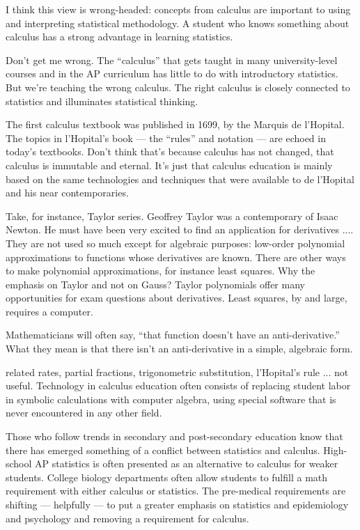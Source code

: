 I think this view is wrong-headed: concepts from calculus are important to using and interpreting statistical methodology.  A student who knows something about calculus has a strong advantage in learning statistics.

Don't get me wrong.  The ``calculus'' that gets taught in many university-level courses and in the AP curriculum has little to do with introductory statistics.  But we're teaching the wrong calculus.  The right calculus is closely connected to statistics and illuminates statistical thinking.

The first calculus textbook was published in 1699, by the Marquis de l'Hopital.  The topics in l'Hopital's book --- the ``rules'' and notation --- are echoed in today's textbooks.  Don't think that's because calculus has not changed, that calculus is immutable and eternal.  It's just that calculus education is mainly based on the same technologies and techniques that were available to de l'Hopital and his near contemporaries.

Take, for instance, Taylor series.  Geoffrey Taylor was a contemporary of Isaac Newton.   He must have been very excited to find an application for derivatives ....  They are not used so much except for algebraic purposes: low-order polynomial approximations to functions whose derivatives are known.  There are other ways to make polynomial approximations, for instance least squares.   Why the emphasis on Taylor and not on Gauss?  Taylor polynomials offer many opportunities for exam questions about derivatives.  Least squares, by and large, requires a computer.

Mathematicians will often say, ``that function doesn't have an anti-derivative.''  What they mean is that there isn't an anti-derivative in a simple, algebraic form.



related rates, partial fractions, trigonometric substitution, l'Hopital's rule ... not useful.  Technology in calculus education often consists of replacing student labor in symbolic calculations with computer algebra, using special software that is never encountered in any other field.



Those who follow trends in secondary and post-secondary education know that there has emerged something of a conflict between statistics and calculus.  High-school AP statistics is often presented as an alternative to calculus for weaker students.  College biology departments often allow students to fulfill a math requirement with either calculus or statistics.  The pre-medical requirements are shifting --- helpfully --- to put a greater emphasis on statistics and epidemiology and psychology and removing a requirement for calculus.

